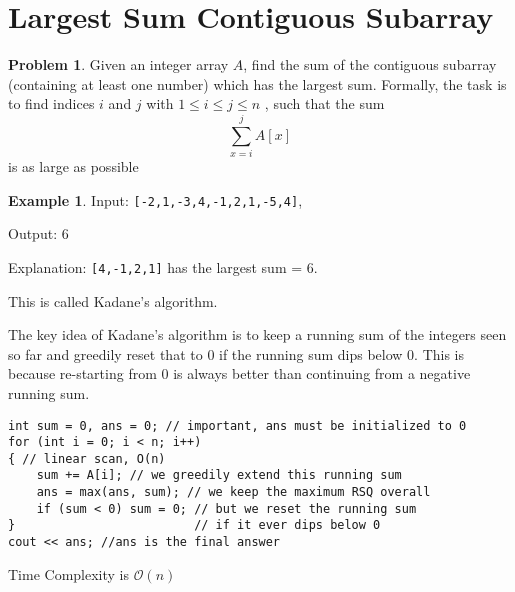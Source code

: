 \documentclass[twoside,12pt,a4paper,english]{book}
\theoremstyle{definition}
\newtheorem*{exmp}{Example}
\theoremstyle{problemstyle}
\newtheorem*{problem}{Problem} %
\theoremstyle{problemstyle}
\theoremstyle{problemstyle}
\begin{document}
\section{Largest Sum Contiguous Subarray}
\begin{problem}
Given an integer array $A$, find the sum of the contiguous subarray (containing at least one number) which has the largest sum. Formally, the task is to find indices $i$  and $j$  with $1\leq i\leq j\leq n$  , such that the sum
$$\sum_{x=i}^j A[x]$$ is as large as possible
\end{problem}
\begin{exmp}
Input: \texttt{[-2,1,-3,4,-1,2,1,-5,4]},

Output: $6$

Explanation: \texttt{[4,-1,2,1]} has the largest sum = 6.
\end{exmp}
\begin{tcolorbox}[title=Solution, breakable]

This is called Kadane's algorithm.

The key idea of Kadane’s algorithm is to keep a running sum of the integers seen so far and
greedily reset that to $0$ if the running sum dips below $0$. This is because re-starting from
$0$ is always better than continuing from a negative running sum.

\begin{lstlisting}
int sum = 0, ans = 0; // important, ans must be initialized to 0
for (int i = 0; i < n; i++)
{ // linear scan, O(n)
    sum += A[i]; // we greedily extend this running sum
    ans = max(ans, sum); // we keep the maximum RSQ overall
    if (sum < 0) sum = 0; // but we reset the running sum
}                         // if it ever dips below 0
cout << ans; //ans is the final answer
\end{lstlisting}
Time Complexity is $\mathcal{O}(n)$
\end{tcolorbox}
\end{document}
